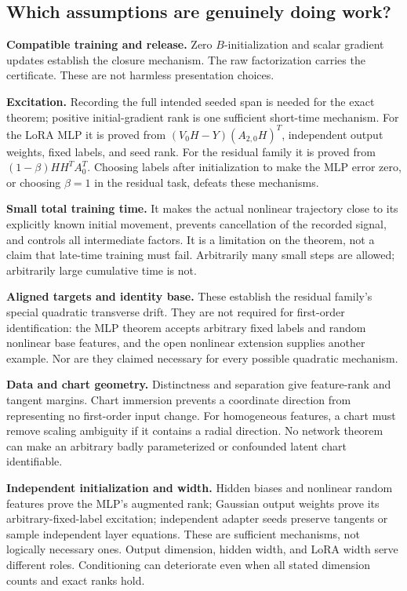 \documentclass[12pt,a4paper]{article}
\theoremstyle{readable}
\theoremstyle{definition}\newtheorem{example}[theorem]{Example}
\begin{document}
\subsection{Which assumptions are genuinely doing work?}
\textbf{Compatible training and release.} Zero \(B\)-initialization and scalar gradient updates establish the closure mechanism. The raw factorization carries the certificate. These are not harmless presentation choices.

\textbf{Excitation.} Recording the full intended seeded span is needed for the exact theorem; positive initial-gradient rank is one sufficient short-time mechanism. For the LoRA MLP it is proved from \((V_0H-Y)(A_{2,0}H)^T\), independent output weights, fixed labels, and seed rank. For the residual family it is proved from \((1-\beta)HH^TA_0^T\). Choosing labels after initialization to make the MLP error zero, or choosing \(\beta=1\) in the residual task, defeats these mechanisms.

\textbf{Small total training time.} It makes the actual nonlinear trajectory close to its explicitly known initial movement, prevents cancellation of the recorded signal, and controls all intermediate factors. It is a limitation on the theorem, not a claim that late-time training must fail. Arbitrarily many small steps are allowed; arbitrarily large cumulative time is not.

\textbf{Aligned targets and identity base.} These establish the residual family's special quadratic transverse drift. They are not required for first-order identification: the MLP theorem accepts arbitrary fixed labels and random nonlinear base features, and the open nonlinear extension supplies another example. Nor are they claimed necessary for every possible quadratic mechanism.

\textbf{Data and chart geometry.} Distinctness and separation give feature-rank and tangent margins. Chart immersion prevents a coordinate direction from representing no first-order input change. For homogeneous features, a chart must remove scaling ambiguity if it contains a radial direction. No network theorem can make an arbitrary badly parameterized or confounded latent chart identifiable.

\textbf{Independent initialization and width.} Hidden biases and nonlinear random features prove the MLP's augmented rank; Gaussian output weights prove its arbitrary-fixed-label excitation; independent adapter seeds preserve tangents or sample independent layer equations. These are sufficient mechanisms, not logically necessary ones. Output dimension, hidden width, and LoRA width serve different roles. Conditioning can deteriorate even when all stated dimension counts and exact ranks hold.
\end{document}
